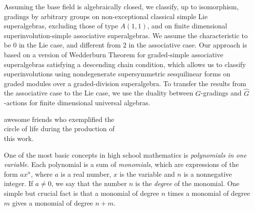 %
\begin{prefatory}
\frontpage
\abstract%
    Assuming the base field is algebraically closed, we classify, up to isomorphism, gradings by arbitrary groups on non-exceptional classical simple Lie superalgebras, excluding those of type $A(1,1)$, and on finite dimensional superinvolution-simple associative superalgebras. 
    We assume the characteristic to be $0$ in the Lie case, and different from $2$ in the associative case. 
    Our approach is based on a version of Wedderburn Theorem for graded-simple associative superalgebras satisfying a descending chain condition, which allows us to classify superinvolutions using nondegenerate supersymmetric sesquilinear forms on graded modules over a graded-division superalgebra. 
    To transfer the results from the associative case to the Lie case, we use the duality between $G$-gradings and $\widehat G$-actions for finite dimensional universal algebras. 
\dedication%
{\flushright
To Ruth Roy and Dauto Kean-Dos-Santos,\\ 
}
\medskip
\hfill \begin{minipage}[t]{0.46\textwidth}
awesome friends who exemplified the\\ circle of life 
during the production of\\ 
this work.
\end{minipage}


\laysummary %

One of the most basic concepts in high school mathematics is \emph{polynomials in one variable}. 
Each polynomial is a sum of \emph{monomials}, which are expressions of the form $a x^n$, where $a$ is a real number, $x$ is the variable and $n$ is a nonnegative integer. 
If $a \neq 0$, we say that the number $n$ is the \emph{degree} of the monomial. 
One simple but crucial fact is that a monomial of degree $n$ times a monomial of degree $m$ gives a monomial of degree $n + m$. 


\end{prefatory}

